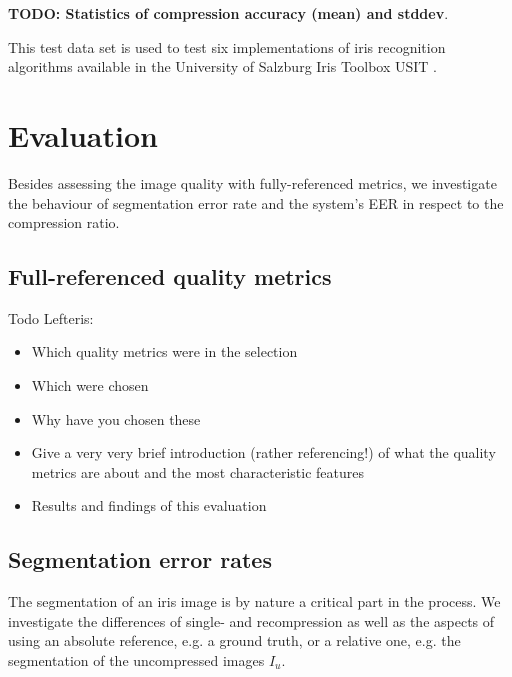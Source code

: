 \documentclass[10pt,twocolumn,letterpaper]{article}
\begin{document}
\textbf{TODO: Statistics of compression accuracy (mean) and stddev}.

This test data set is used to test six implementations of iris recognition algorithms available in the University of Salzburg Iris Toolbox USIT \cite{rathgeb}. 


\section{Evaluation}
\label{section:eval}
 Besides assessing the image quality with fully-referenced metrics, we investigate the behaviour of segmentation error rate and the system's EER in respect to the compression ratio.


\subsection{Full-referenced quality metrics}
Todo Lefteris:
\begin{itemize}
 \item Which quality metrics were in the selection
 \item Which were chosen
 \item Why have you chosen these
 \item Give a very very brief introduction (rather referencing!) of what the quality metrics are about and the most characteristic features
 \item Results and findings of this evaluation
\end{itemize}

\subsection{Segmentation error rates}
\label{section:ser}
The segmentation of an iris image is by nature a critical part in the process. We investigate the differences of single- and recompression as well as the aspects of using an absolute reference, e.g. a ground truth, or a relative one, e.g. the segmentation of the uncompressed images $I_u$.
\end{document}
